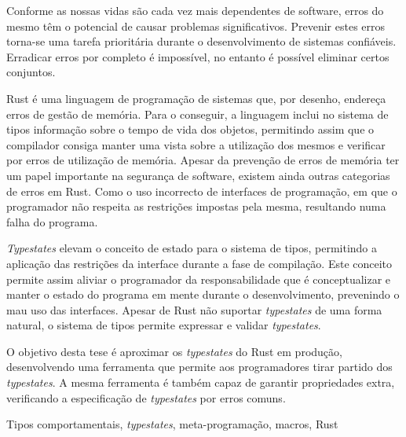 
Conforme as nossas vidas são cada vez mais dependentes de software,
erros do mesmo têm o potencial de causar problemas significativos.
Prevenir estes erros torna-se uma tarefa prioritária durante o desenvolvimento de sistemas confiáveis.
Erradicar erros por completo é impossível, no entanto é possível eliminar certos conjuntos.

Rust é uma linguagem de programação de sistemas que, por desenho, endereça erros de gestão de memória.
Para o conseguir, a linguagem inclui no sistema de tipos informação sobre o tempo de vida dos objetos,
permitindo assim que o compilador consiga manter uma vista sobre a utilização dos mesmos e verificar por erros de utilização de memória.
Apesar da prevenção de erros de memória ter um papel importante na segurança de software,
existem ainda outras categorias de erros em Rust.
Como o uso incorrecto de interfaces de programação, em que o programador não respeita as restrições impostas pela mesma, resultando numa falha do programa.

\emph{Typestates} elevam o conceito de estado para o sistema de tipos,
permitindo a aplicação das restrições da interface durante a fase de compilação.
Este conceito permite assim aliviar o programador da responsabilidade que é conceptualizar e manter o estado do programa em mente durante o desenvolvimento, prevenindo o mau uso das interfaces.
Apesar de Rust não suportar \emph{typestates} de uma forma natural,
o sistema de tipos permite expressar e validar \emph{typestates}.

O objetivo desta tese é aproximar os \emph{typestates} do Rust em produção,
desenvolvendo uma ferramenta que permite aos programadores tirar partido dos \emph{typestates}.
A mesma ferramenta é também capaz de garantir propriedades extra,
verificando a especificação de \emph{typestates} por erros comuns.

\begin{keywords}
Tipos comportamentais, \emph{typestates}, meta-programação, macros, Rust
\end{keywords}
